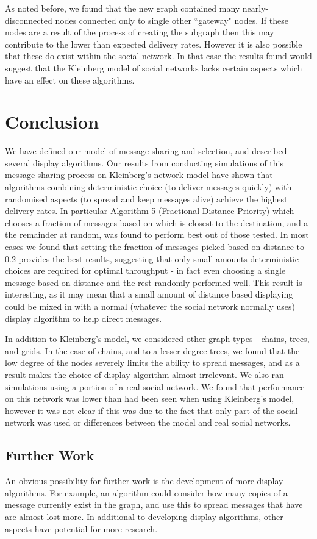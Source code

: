 \documentclass[bsc,frontabs,twoside,singlespacing,parskip,deptreport]{infthesis}     %
\begin{document}
As noted before, we found that the new graph contained many nearly-disconnected nodes connected only to single other ``gateway" nodes. If these nodes are a result of the process of creating the subgraph then this may contribute to the lower than expected delivery rates. However it is also possible that these do exist within the social network. In that case the results found would suggest that the Kleinberg model of social networks lacks certain aspects which have an effect on these algorithms.

\chapter{Conclusion} \label{chapter5}
We have defined our model of message sharing and selection, and described several display algorithms. Our results from conducting simulations of this message sharing process on Kleinberg's network model have shown that algorithms combining deterministic choice (to deliver messages quickly) with randomised aspects (to spread and keep messages alive) achieve the highest delivery rates. In particular Algorithm 5 (Fractional Distance Priority) which chooses a fraction of messages based on which is closest to the destination, and a the remainder at random, was found to perform best out of those tested. In most cases we found that setting the fraction of messages picked based on distance to 0.2 provides the best results, suggesting that only small amounts deterministic choices are required for optimal throughput - in fact even choosing a single message based on distance and the rest randomly performed well. This result is interesting, as it may mean that a small amount of distance based displaying could be mixed in with a normal (whatever the social network normally uses) display algorithm to help direct messages.

In addition to Kleinberg's model, we considered other graph types - chains, trees, and grids. In the case of chains, and to a lesser degree trees, we found that the low degree of the nodes severely limits the ability to spread messages, and as a result makes the choice of display algorithm almost irrelevant. We also ran simulations using a portion of a real social network. We found that performance on this network was lower than had been seen when using Kleinberg's model, however it was not clear if this was due to the fact that only part of the social network was used or differences between the model and real social networks.

\section{Further Work}
An obvious possibility for further work is the development of more display algorithms. For example, an algorithm could consider how many copies of a message currently exist in the graph, and use this to spread messages that have are almost lost more. In additional to developing display algorithms, other aspects have potential for more research.
\end{document}

